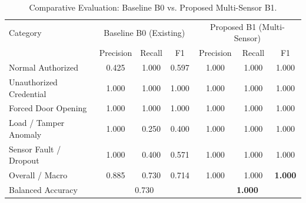 \begin{table}[!htbp]
\renewcommand{\arraystretch}{1.05}
\centering
\small
\caption{Comparative Evaluation: Baseline B0 vs. Proposed Multi-Sensor B1.}
\label{tab:b0_vs_b1}
\vspace{5pt}
\begin{tabular}{l c c c c c c}
\hline
Category & \multicolumn{3}{c}{Baseline B0 (Existing)} & \multicolumn{3}{c}{Proposed B1 (Multi-Sensor)} \\
 & Precision & Recall & F1 & Precision & Recall & F1 \\
\hline
Normal Authorized & 0.425 & 1.000 & 0.597 & 1.000 & 1.000 & 1.000 \\
Unauthorized Credential & 1.000 & 1.000 & 1.000 & 1.000 & 1.000 & 1.000 \\
Forced Door Opening & 1.000 & 1.000 & 1.000 & 1.000 & 1.000 & 1.000 \\
Load / Tamper Anomaly & 1.000 & 0.250 & 0.400 & 1.000 & 1.000 & 1.000 \\
Sensor Fault / Dropout & 1.000 & 0.400 & 0.571 & 1.000 & 1.000 & 1.000 \\
\hline
Overall / Macro & 0.885 & 0.730 & 0.714 & 1.000 & 1.000 & \textbf{1.000} \\
Balanced Accuracy & \multicolumn{3}{c}{0.730} & \multicolumn{3}{c}{\textbf{1.000}} \\
\hline
\end{tabular}
\end{table}
